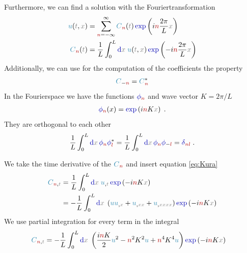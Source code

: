 \documentclass[10pt,fleqn, %
reqno,a4paper]{article}
\makeatletter
\def\mathcolor#1#{\@mathcolor{#1}}
\def\@mathcolor#1#2#3{%
        \protect\leavevmode
        \begingroup\color#1{#2}#3\endgroup
}
\newcommand{\nx}{\mathcolor{gray}{x}}
\newcommand{\nt}{\mathcolor{gray}{t}}
\newcommand{\nnu}{\mathcolor{cyan!70!black}{u}}
\newcommand{\nexp}{\mathcolor{blue!70!black}{\exp}}
\newcommand{\nn}{\mathcolor{red!70!black}{n}}
\newcommand{\nl}{\mathcolor{red!70!black}{l}}
\newcommand{\dif}{\mathrm{\mathcolor{blue!70!black}{d } } }
\newcommand{\ndelta}{\mathcolor{blue!70!black}{\delta}}
\newcommand{\nphi}{\mathcolor{blue!70!black}{\phi}}
\newcommand{\nC}{\mathcolor{cyan!70!black}{C}}
\newcommand{\npartial}{\mathcolor{blue!70!black}{\partial}}
\makeatother
\begin{document}
Furthermore, we can find a solution with the Fouriertransformation
\begin{align}
        \nnu (\nt, \nx) &= \sum_{\nn=-\infty}^{\infty} \nC_{\nn}(\nt) \nexp \left( i\nn \frac{2\pi}{L} \nx \right) \label{eq:u_coeff} \\
        \nC_{\nn} (\nt) &= \frac{1}{L} \int_{0}^{L} \dif \nx \; \nnu (\nt, \nx) \nexp \left( -i\nn \frac{2\pi}{L} \nx \right)  \label{eq:C_int}
\end{align}
Additionally, we can use for the computation of the coefficients the property
\begin{align*}
        \nC_{-\nn} = \nC_{\nn}^{*}
\end{align*}
In the Fourierspace we have the functions $ \nphi _{\nn} $ and wave vector $ K = 2\pi/ L $
\begin{align*}
        \nphi _{\nn} (x) = \nexp \left( i\nn K \nx \right) \; .
\end{align*}
They are orthogonal to each other
\begin{align}
        \frac{1}{L}\int_{0}^{L} \dif \nx \, \nphi_{\nn} \nphi_{\nl}^{*} = \frac{1}{L}\int_{0}^{L} \dif \nx \, \nphi_{\nn} \nphi_{-\nl} = \ndelta _{\nn \nl} \; . \label{eq:phi_ortho}
\end{align}

We take the time derivative of the $ \nC_{\nn} $ and insert equation \eqref{eq:Kura}
\begin{align*}
        \nC_{\nn,\nt} &= \frac{1}{L} \int_{0}^{L} \dif \nx \; \nnu _{,\nt} \nexp \left( -i\nn K \nx \right)\\
        &= - \frac{1}{L} \int_{0}^{L} \dif \nx \; \left( \nnu\nnu_{,\nx} + \nnu_{,\nx\nx} + \nnu_{,\nx\nx\nx\nx} \right) \nexp \left( -i\nn K \nx \right)
\end{align*}
We use partial integration for every term in the integral
\begin{align*}
        \nC_{\nn,\nt} &= - \frac{1}{L} \int_{0}^{L} \dif \nx \; \left( \frac{i\nn K}{2}\nnu^2 - \nn^2K^2\nnu + \nn^4K^4\nnu \right) \nexp \left( -i\nn K \nx \right)
\end{align*}
\end{document}
